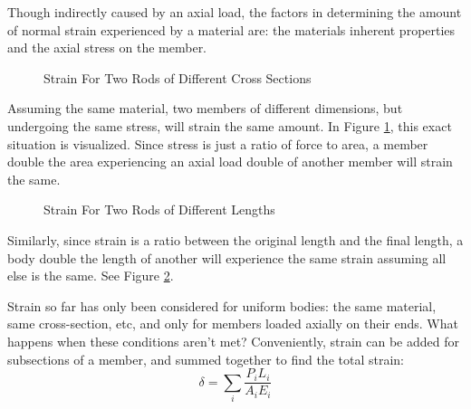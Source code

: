 \documentclass[12pt]{article}
\begin{document}
Though indirectly caused by an axial load, the factors in determining the amount of normal strain experienced by a material are: the materials inherent properties and the axial stress on the member.

\begin{figure}[H]
  \centering
  \begin{subfigure}[h]{0.48\textwidth}
    \centering
    
  \end{subfigure}
  \vrule
  \begin{subfigure}[h]{0.48\textwidth}
    \centering
    
  \end{subfigure}
  \caption{Strain For Two Rods of Different Cross Sections}
  \label{fig:015}
\end{figure}

Assuming the same material, two members of different dimensions, but undergoing the same stress, will strain the same amount. In Figure \ref{fig:015}, this exact situation is visualized. Since stress is just a ratio of force to area, a member double the area experiencing an axial load double of another member will strain the same.

\begin{figure}[H]
  \centering
  \begin{subfigure}[H]{\textwidth}
    \centering
    
  \end{subfigure}
  \begin{subfigure}[H]{\textwidth}
    \centering
    
  \end{subfigure}
  \caption{Strain For Two Rods of Different Lengths}
  \label{fig:strainForTwoRodsOfDifferentLengths}
\end{figure}

Similarly, since strain is a ratio between the original length and the final length, a body double the length of another will experience the same strain assuming all else is the same. See Figure \ref{fig:strainForTwoRodsOfDifferentLengths}.

Strain so far has only been considered for uniform bodies: the same material, same cross-section, etc, and only for members loaded axially on their ends. What happens when these conditions aren't met? Conveniently, strain can be added for subsections of a member, and summed together to find the total strain:
\begin{equation*}
  \delta = \sum_{i}^{} \frac{P_iL_i}{A_iE_i}
\end{equation*}
\end{document}

